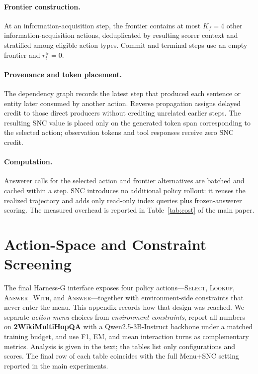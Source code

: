 \documentclass[letterpaper]{article} %
\begin{document}
\paragraph{Frontier construction.}
At an information-acquisition step, the frontier contains at most $K_f{=}4$ other information-acquisition actions, deduplicated by resulting scorer context and stratified among eligible action types.
Commit and terminal steps use an empty frontier and $r_t^{\mathrm{fr}}=0$.

\paragraph{Provenance and token placement.}
The dependency graph records the latest step that produced each sentence or entity later consumed by another action.
Reverse propagation assigns delayed credit to those direct producers without crediting unrelated earlier steps.
The resulting SNC value is placed only on the generated token span corresponding to the selected action; observation tokens and tool responses receive zero SNC credit.

\paragraph{Computation.}
Answerer calls for the selected action and frontier alternatives are batched and cached within a step.
SNC introduces no additional policy rollout: it reuses the realized trajectory and adds only read-only index queries plus frozen-answerer scoring.
The measured overhead is reported in Table~\ref{tab:cost} of the main paper.

\section{Action-Space and Constraint Screening}
\label{app:action-screen}

The final Harness-G interface exposes four policy actions---\textsc{Select}, \textsc{Lookup}, \textsc{Answer\_With}, and \textsc{Answer}---together with environment-side constraints that never enter the menu.
This appendix records how that design was reached.
We separate \emph{action-menu} choices from \emph{environment constraints}, report all numbers on \textbf{2WikiMultiHopQA} with a Qwen2.5-3B-Instruct backbone under a matched training budget, and use F1, EM, and mean interaction turns as complementary metrics.
Analysis is given in the text; the tables list only configurations and scores.
The final row of each table coincides with the full Menu+SNC setting reported in the main experiments.
\end{document}
